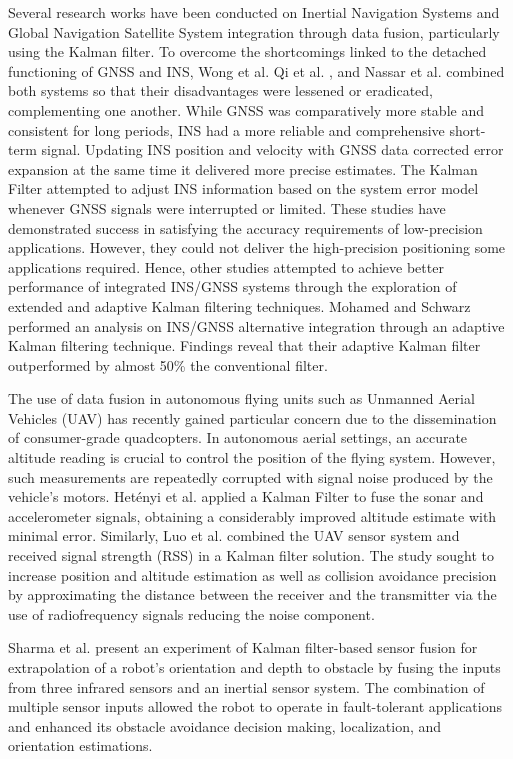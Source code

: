 Several research works have been conducted on Inertial Navigation Systems and Global Navigation Satellite System integration through data fusion, particularly using the Kalman filter. To overcome the shortcomings linked to the detached functioning of GNSS and INS, Wong et al. \cite{wong1988high} Qi et al. \cite{qi2002direct}, and Nassar et al. \cite{nassar2004improving} combined both systems so that their disadvantages were lessened or eradicated, complementing one another. While GNSS was comparatively more stable and consistent for long periods, INS had a more reliable and comprehensive short-term signal. Updating INS position and velocity with GNSS data corrected error expansion at the same time it delivered more precise estimates. The Kalman Filter attempted to adjust INS information based on the system error model whenever GNSS signals were interrupted or limited. These studies have demonstrated success in satisfying the accuracy requirements of low-precision applications. However, they could not deliver the high-precision positioning some applications required. Hence, other studies attempted to achieve better performance of integrated INS/GNSS systems through the exploration of extended and adaptive Kalman filtering techniques. Mohamed and Schwarz \cite{mohamed1999adaptive} performed an analysis on INS/GNSS alternative integration through an adaptive Kalman filtering technique. Findings reveal that their adaptive Kalman filter outperformed by almost 50\% the conventional filter.

The use of data fusion in autonomous flying units such as Unmanned Aerial Vehicles (UAV) has recently gained particular concern due to the dissemination of consumer-grade quadcopters. In autonomous aerial settings, an accurate altitude reading is crucial to control the position of the flying system. However, such measurements are repeatedly corrupted with signal noise produced by the vehicle's motors. Hetényi et al. \cite{hetenyi2016sensor} applied a Kalman Filter to fuse the sonar and accelerometer signals, obtaining a considerably improved altitude estimate with minimal error. Similarly, Luo et al. \cite{luo2013uav} combined the UAV sensor system and received signal strength (RSS) in a Kalman filter solution. The study sought to increase position and altitude estimation as well as collision avoidance precision by approximating the distance between the receiver and the transmitter via the use of radiofrequency signals reducing the noise component.

Sharma et al. \cite{sharma2014sensor} present an experiment of Kalman filter-based sensor fusion for extrapolation of a robot's orientation and depth to obstacle by fusing the inputs from three infrared sensors and an inertial sensor system. The combination of multiple sensor inputs allowed the robot to operate in fault-tolerant applications and enhanced its obstacle avoidance decision making, localization, and orientation estimations.

